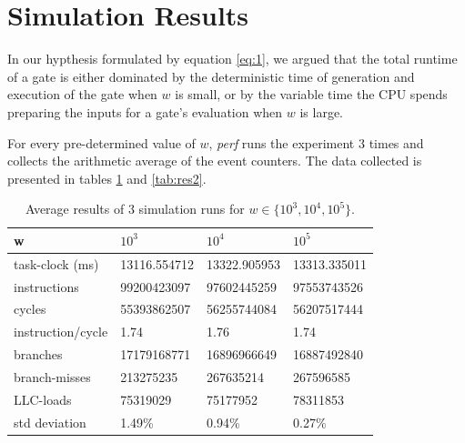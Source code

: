 \section{Simulation Results}
In our hypthesis formulated by equation \ref{eq:1}, we argued that the total
runtime of a gate is either dominated by the deterministic time of generation
and execution of the gate when $w$ is small, or by the variable time the CPU spends preparing the
inputs for a gate's evaluation when $w$ is large.
\par
For every pre-determined value of $w$, \textit{perf} runs the experiment 3 times
and collects the arithmetic average of the event counters. The data
collected is presented in tables \ref{tab:res1} and \ref{tab:res2}.
\par

\begin{table}[h]
\centering
\caption{Average results of 3 simulation runs for $ w \in \{10^3, 10^4, 10^5\}$.}
\label{tab:res1}
\begin{tabular}{|l|l|l|l|}
\hline
w                 & $10^3$       & $10^4$       & $10^5$       \\ \hline
task-clock (ms)   & 13116.554712 & 13322.905953 & 13313.335011 \\ \hline
instructions      & 99200423097  & 97602445259  & 97553743526  \\ \hline
cycles            & 55393862507  & 56255744084  & 56207517444  \\ \hline
instruction/cycle & 1.74         & 1.76         & 1.74         \\ \hline
branches          & 17179168771  & 16896966649  & 16887492840  \\ \hline
branch-misses     & 213275235    & 267635214    & 267596585    \\ \hline
LLC-loads         & 75319029     & 75177952     & 78311853     \\ \hline
std deviation     & 1.49\%       & 0.94\%       & 0.27\%       \\ \hline
\end{tabular}
\end{table}


